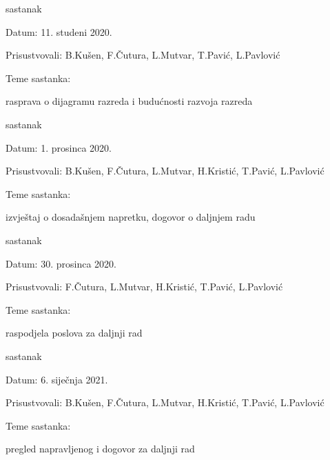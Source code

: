 \begin{packed_enum}
				\item  sastanak
		\item[] \begin{packed_item}
			\item Datum: 11. studeni 2020.
			\item Prisustvovali: B.Kušen, F.Čutura, L.Mutvar, T.Pavić, L.Pavlović
			\item Teme sastanka:
			\begin{packed_item}
				\item  rasprava o dijagramu razreda i budućnosti razvoja razreda
			\end{packed_item}
		\end{packed_item}
	
					\item  sastanak
	\item[] \begin{packed_item}
		\item Datum: 1. prosinca 2020.
		\item Prisustvovali: B.Kušen, F.Čutura, L.Mutvar, H.Kristić, T.Pavić, L.Pavlović
		\item Teme sastanka:
		\begin{packed_item}
			\item  izvještaj o dosadašnjem napretku, dogovor o daljnjem radu
		\end{packed_item}
	\end{packed_item}

							\item  sastanak
		\item[] \begin{packed_item}
			\item Datum: 30. prosinca 2020.
			\item Prisustvovali: F.Čutura, L.Mutvar, H.Kristić, T.Pavić, L.Pavlović
			\item Teme sastanka:
			\begin{packed_item}
				\item  raspodjela poslova za daljnji rad
			\end{packed_item}
		\end{packed_item}
	
			\item  sastanak
		\item[] \begin{packed_item}
			\item Datum: 6. siječnja 2021.
			\item Prisustvovali: B.Kušen, F.Čutura, L.Mutvar, H.Kristić, T.Pavić, L.Pavlović
			\item Teme sastanka:
			\begin{packed_item}
				\item  pregled napravljenog i dogovor za daljnji rad
			\end{packed_item}
		\end{packed_item}
	

\end{packed_enum}
